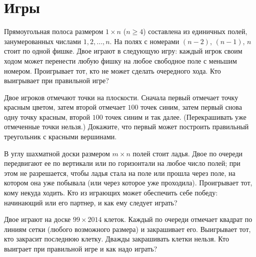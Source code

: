 
\section*{Игры}


\begin{problems}

\item
Прямоугольная полоса размером $1 \times n$ ($n \geq 4$) составлена из единичных
полей, занумерованных числами $1, 2, \ldots, n$.
На полях с номерами $(n - 2)$, $(n - 1)$, $n$ стоит по одной фишке.
Двое играют в следующую игру: каждый игрок своим ходом может перенести любую
фишку на любое свободное поле с меньшим номером.
Проигрывает тот, кто не может сделать очередного хода.
Кто выигрывает при правильной игре?

\item
Двое игроков отмечают точки на плоскости.
Сначала первый отмечает точку красным цветом, затем второй отмечает $100$ точек
синим, затем первый снова одну точку красным, второй $100$ точек синим и так
далее.
(Перекрашивать уже отмеченные точки нельзя.)
Докажите, что первый может построить правильный треугольник с красными
вершинами.

\item
В углу шахматной доски размером $m \times n$ полей стоит ладья.
Двое по очереди передвигают ее по вертикали или по горизонтали на любое число
полей;
при этом не разрешается, чтобы ладья стала на поле или прошла через поле,
на котором она уже побывала (или через которое уже проходила).
Проигрывает тот, кому некуда ходить.
Кто из играющих может обеспечить себе победу: начинающий или его партнер, и как
ему следует играть?

\item
Двое играют на доске $99 \times 2014$ клеток.
Каждый по очереди отмечает квадрат по линиям сетки (любого возможного размера)
и закрашивает его.
Выигрывает тот, кто закрасит последнюю клетку.
Дважды закрашивать клетки нельзя.
Кто выиграет при правильной игре и как надо играть?



\end{problems}
